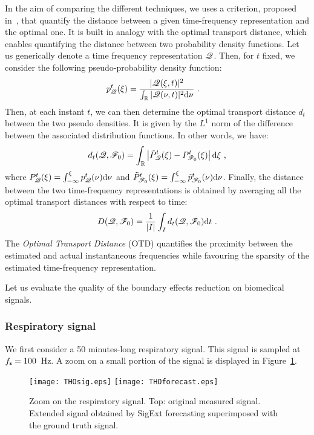 In the aim of comparing the different techniques, we uses a criterion, proposed in~\cite{Daubechies16conceft}, that quantify the distance between a given time-frequency representation and the optimal one. It is built in analogy with the optimal transport distance, which enables quantifying the distance between two probability density functions. Let us generically denote a time frequency representation ${\mathscr Q}$. Then, for $t$ fixed, we consider the following pseudo-probability density function:
\begin{align}
p_{\mathscr Q}^t(\xi) &= \dfrac{|{\mathscr Q}(\xi,t)|^2}{\int_{\mathbb R} |{\mathscr Q}(\nu,t)|^2\mathrm{d}\nu}\ .
\label{eq:ppdf}
\end{align}
Then, at each instant $t$, we can then determine the optimal transport distance $d_{t}$ between the two pseudo densities. It is given by the $L^1$ norm of the difference between the associated distribution functions. In other words, we have:
\begin{equation*}
d_{t}(\ccQ,\ccF_0) = \int_\RR\left|\tilde P_{\ccQ}^t(\xi)-  P_{\ccF_0}^t(\xi)\right|\dd\xi\ ,
\end{equation*}
where $P_{{\mathscr Q}}^t(\xi)=\int_{-\infty}^\xi p_{{\mathscr Q}}^t(\nu)\mathrm{d}\nu$ and $\tilde P_{{\mathscr F}_0}^t(\xi)=\int_{-\infty}^\xi\tilde p_{{\mathscr F}_0}^t(\nu)\mathrm{d}\nu$.
Finally, the distance between the two time-frequency representations is obtained by averaging all the optimal transport distances with respect to time:
\begin{equation}
D({\mathscr Q},{\mathscr F}_0) = \frac1{|I|}\int_I d_{t}({\mathscr Q},{\mathscr F}_0)\mathrm{d}t\ .
\end{equation}
The \textit{Optimal Transport Distance} (OTD) quantifies the proximity between the estimated and actual instantaneous frequencies while favouring the sparsity of the estimated time-frequency representation.

Let us evaluate the quality of the boundary effects reduction on biomedical signals.


\subsubsection{Respiratory signal}
We first consider a 50 minutes-long respiratory signal. This signal is sampled at $f_{\mathsf s}=100$~Hz. A zoom on a small portion of the signal is displayed in Figure~\ref{fig:tho}.

\begin{figure}
\texttt{[image: THOsig.eps]}
\texttt{[image: THOforecast.eps]}
\caption{Zoom on the respiratory signal. Top: original measured signal. Extended signal obtained by {\sf SigExt} forecasting superimposed with the ground truth signal.}
\label{fig:tho}
\end{figure}


